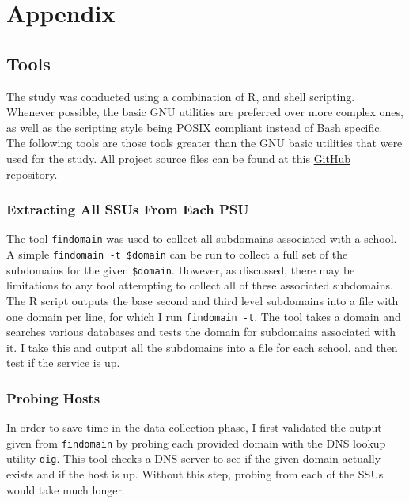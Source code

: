 \documentclass{article}
\theoremstyle{definition}
\begin{document}
\section{Appendix}

\subsection{Tools} \label{sec:tools}
The study was conducted using a combination of R, and shell scripting.
Whenever possible, the basic GNU utilities are preferred over more complex
ones, as well as the scripting style being POSIX compliant instead of Bash
specific. The following tools are those tools greater than the GNU basic utilities
that were used for the study.
All project source files can be found at this
\href{https://github.com/chrissobczak/os-survey}{GitHub} repository.

\subsubsection{Extracting All SSUs From Each PSU}
The tool \texttt{findomain} was used to collect all subdomains associated with a school.
A simple \texttt{findomain -t \$domain} can be run to collect a full set of the subdomains
for the given \texttt{\$domain}. However, as discussed, there may be limitations to any tool
attempting to collect all of these associated subdomains.
The R script outputs the base second and third level subdomains
into a file with one domain per line, for which I run \texttt{findomain -t}.
The tool takes a domain and searches various databases and tests the domain
for subdomains associated with it. I take this and output all the subdomains
into a file for each school, and then test if the service is up.

\subsubsection{Probing Hosts}
In order to save time in the data collection phase, I first validated the output
given from \texttt{findomain} by probing each provided domain with the
DNS lookup utility \texttt{dig}. This tool checks a DNS server to see if the
given domain actually exists and if the host is up. Without this step,
probing from each of the SSUs would take much longer.
\end{document}

